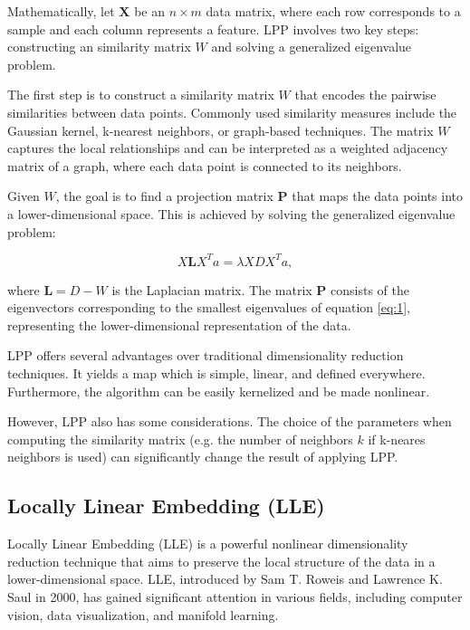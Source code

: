 Mathematically, let $\mathbf{X}$ be an $n \times m$ data matrix, where each row corresponds to a sample and each column represents a feature. LPP involves two key steps: constructing an similarity matrix $W$ and solving a generalized eigenvalue problem.

The first step is to construct a similarity matrix $W$ that encodes the pairwise similarities between data points. Commonly used similarity measures include the Gaussian kernel, k-nearest neighbors, or graph-based techniques. The matrix $W$ captures the local relationships and can be interpreted as a weighted adjacency matrix of a graph, where each data point is connected to its neighbors.

Given $W$, the goal is to find a projection matrix $\mathbf{P}$ that maps the data points into a lower-dimensional space. This is achieved by solving the generalized eigenvalue problem:

\begin{equation} \label{eq:1}
  X \mathbf{L} X^T a = \lambda XDX^Ta,
\end{equation}

where $\mathbf{L} = D-W$ is the Laplacian matrix. The matrix $\mathbf{P}$ consists of the eigenvectors corresponding to the smallest eigenvalues of equation \ref{eq:1}, representing the lower-dimensional representation of the data.

LPP offers several advantages over traditional dimensionality reduction techniques. It yields a map which is simple, linear, and defined everywhere. Furthermore, the algorithm can be easily kernelized and be made nonlinear.

However, LPP also has some considerations. The choice of the parameters when computing the similarity matrix (e.g. the number of neighbors $k$ if k-neares neighbors is used) can significantly change the result of applying LPP.

\subsection{Locally Linear Embedding (LLE)}

Locally Linear Embedding (LLE) \cite{lle} is a powerful nonlinear dimensionality reduction technique that aims to preserve the local structure of the data in a lower-dimensional space. LLE, introduced by Sam T. Roweis and Lawrence K. Saul in 2000, has gained significant attention in various fields, including computer vision, data visualization, and manifold learning.

